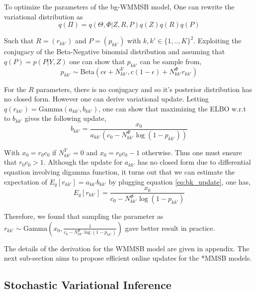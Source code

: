 To optimize the parameters of the bg-WMMSB model, One can rewrite the variational distribution as
\begin{equation*}
q(\Pi) = q(\Theta, \Phi|Z, R, P) q(Z)q(R)q(P)
\end{equation*}

Such that $R=(r_{kk'})$ and $P=(p_{kk'})$ with $k,k' \in \{1,..,K\}^2$. Exploiting the conjugacy of the Beta-Negative binomial distribution and assuming that $q(P)=p(P|Y,Z)$  one can show that $p_{kk'}$ can be sample from,
\begin{equation} \label{eq:pk_update}
p_{kk'} \sim \textrm{Beta}(c\epsilon + N^Y_{kk'}, c(1-\epsilon) + N^\Phi_{kk'}r_{kk'})
\end{equation}

For the $R$ parameters, there is no conjugacy and so it's posterior distribution has no closed form. However one can derive variational update. Letting $q(r_{kk'}) = \textrm{Gamma}(a_{kk'},b_{kk'})$, one can show that maximizing the ELBO w.r.t to $b_{kk'}$ gives the following update,
\begin{equation} \label{eq:bk_update}
b_{kk'}= \frac{x_0}{a_{kk'} (c_0  -N^\Phi_{kk'}\log(1-p_{kk'}))}
\end{equation}

With $x_0 = r_0 c_0$ if $N^Y_{kk'}=0$ and $x_0 = r_0 c_0 -1$ otherwise. Thus one must ensure that $r_0 c_0 > 1$. Although the update for $a_{kk'}$ has no closed form due to differential equation involving digamma function, it turns out that we can estimate the expectation of $E_q[r_{kk'}]=a_{kk'}b_{kk'}$ by plugging equation \eqref{eq:bk_update}, one has,
\begin{equation} \label{eq:rk_update}
E_q[r_{kk'}] = \frac{x_0}{c_0  -N^\Phi_{kk'}\log(1-p_{kk'})}
\end{equation}

Therefore, we found  that sampling the parameter as $r_{kk'} \sim \textrm{Gamma}(x_0,\frac{1}{c_0  -N^\Phi_{kk'}\log(1-p_{kk'})} )$ gave better result in practice.

The details of the derivation for the WMMSB model are given in appendix.
The next sub-section aims to propose efficient online updates for the *MMSB models.

\subsection{Stochastic Variational Inference}

